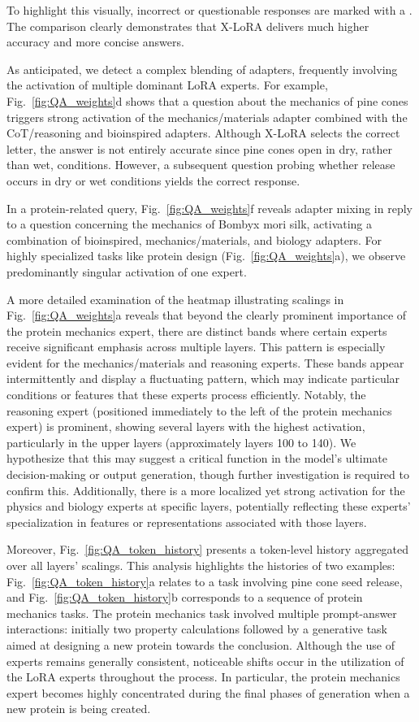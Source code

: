To highlight this visually, incorrect or questionable responses are marked with a . The comparison clearly demonstrates that X-LoRA delivers much higher accuracy and more concise answers.

As anticipated, we detect a complex blending of adapters, frequently involving the activation of multiple dominant LoRA experts. For example, Fig.~\ref{fig:QA_weights}d shows that a question about the mechanics of pine cones triggers strong activation of the mechanics/materials adapter combined with the CoT/reasoning and bioinspired adapters. Although X-LoRA selects the correct letter, the answer is not entirely accurate since pine cones open in dry, rather than wet, conditions. However, a subsequent question probing whether release occurs in dry or wet conditions yields the correct response.

In a protein-related query, Fig.~\ref{fig:QA_weights}f reveals adapter mixing in reply to a question concerning the mechanics of Bombyx mori silk, activating a combination of bioinspired, mechanics/materials, and biology adapters. For highly specialized tasks like protein design (Fig.~\ref{fig:QA_weights}a), we observe predominantly singular activation of one expert.

A more detailed examination of the heatmap illustrating scalings in Fig.~\ref{fig:QA_weights}a reveals that beyond the clearly prominent importance of the protein mechanics expert, there are distinct bands where certain experts receive significant emphasis across multiple layers. This pattern is especially evident for the mechanics/materials and reasoning experts. These bands appear intermittently and display a fluctuating pattern, which may indicate particular conditions or features that these experts process efficiently. Notably, the reasoning expert (positioned immediately to the left of the protein mechanics expert) is prominent, showing several layers with the highest activation, particularly in the upper layers (approximately layers 100 to 140). We hypothesize that this may suggest a critical function in the model’s ultimate decision-making or output generation, though further investigation is required to confirm this. Additionally, there is a more localized yet strong activation for the physics and biology experts at specific layers, potentially reflecting these experts’ specialization in features or representations associated with those layers.

Moreover, Fig.~\ref{fig:QA_token_history} presents a token-level history aggregated over all layers’ scalings. This analysis highlights the histories of two examples: Fig.~\ref{fig:QA_token_history}a relates to a task involving pine cone seed release, and Fig.~\ref{fig:QA_token_history}b corresponds to a sequence of protein mechanics tasks. The protein mechanics task involved multiple prompt-answer interactions: initially two property calculations followed by a generative task aimed at designing a new protein towards the conclusion. Although the use of experts remains generally consistent, noticeable shifts occur in the utilization of the LoRA experts throughout the process. In particular, the protein mechanics expert becomes highly concentrated during the final phases of generation when a new protein is being created.

